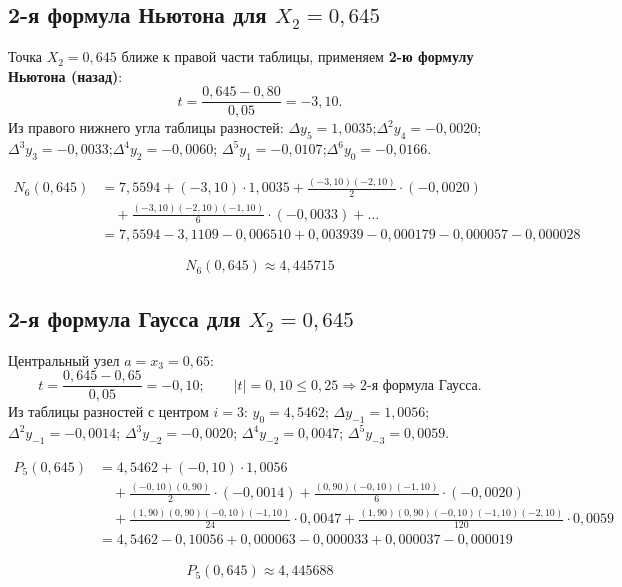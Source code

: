 \documentclass[a4paper,12pt]{article}
\begin{document}
\subsection{2-я формула Ньютона для \texorpdfstring{$X_2=0{,}645$}{X2=0.645}}

Точка $X_2=0{,}645$ ближе к правой части таблицы,
применяем \textbf{2-ю формулу Ньютона (назад)}:
\[
  t=\frac{0{,}645-0{,}80}{0{,}05}=-3{,}10.
\]
Из правого нижнего угла таблицы разностей:
$\Delta y_5=1{,}0035$;\quad $\Delta^2 y_4=-0{,}0020$;\quad
$\Delta^3 y_3=-0{,}0033$;\quad $\Delta^4 y_2=-0{,}0060$;\quad
$\Delta^5 y_1=-0{,}0107$;\quad $\Delta^6 y_0=-0{,}0166$.

\begin{align*}
N_6(0{,}645)
&=7{,}5594
 +(-3{,}10)\cdot1{,}0035
 +\tfrac{(-3{,}10)(-2{,}10)}{2}\cdot(-0{,}0020)\\
&\quad+\tfrac{(-3{,}10)(-2{,}10)(-1{,}10)}{6}\cdot(-0{,}0033)+\ldots\\
&=7{,}5594 - 3{,}1109 - 0{,}006510 + 0{,}003939 - 0{,}000179 - 0{,}000057 - 0{,}000028
\end{align*}

\[
  \boxed{N_6(0{,}645) \approx 4{,}445715}
\]

\subsection{2-я формула Гаусса для \texorpdfstring{$X_2=0{,}645$}{X2=0.645}}

Центральный узел $a=x_3=0{,}65$:
\[
  t=\frac{0{,}645-0{,}65}{0{,}05}=-0{,}10;\qquad |t|=0{,}10\le0{,}25
  \Rightarrow\text{2-я формула Гаусса}.
\]
Из таблицы разностей с центром $i=3$:
$y_0=4{,}5462$;\;
$\Delta y_{-1}=1{,}0056$;\;
$\Delta^2 y_{-1}=-0{,}0014$;\;
$\Delta^3 y_{-2}=-0{,}0020$;\;
$\Delta^4 y_{-2}=0{,}0047$;\;
$\Delta^5 y_{-3}=0{,}0059$.

\begin{align*}
P_5(0{,}645)
&= 4{,}5462
 +(-0{,}10)\cdot1{,}0056\\
&\quad+\tfrac{(-0{,}10)(0{,}90)}{2}\cdot(-0{,}0014)
 +\tfrac{(0{,}90)(-0{,}10)(-1{,}10)}{6}\cdot(-0{,}0020)\\
&\quad+\tfrac{(1{,}90)(0{,}90)(-0{,}10)(-1{,}10)}{24}\cdot0{,}0047
 +\tfrac{(1{,}90)(0{,}90)(-0{,}10)(-1{,}10)(-2{,}10)}{120}\cdot0{,}0059\\
&=4{,}5462 - 0{,}10056 + 0{,}000063 - 0{,}000033 + 0{,}000037 - 0{,}000019
\end{align*}

\[
  \boxed{P_5(0{,}645)\approx 4{,}445688}
\]
\end{document}
